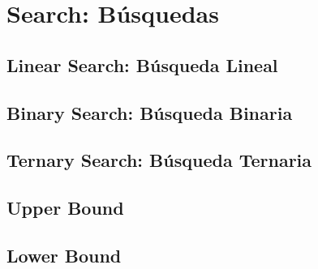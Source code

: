 \documentclass[12pt, fleqn]{report}                             %
\theoremstyle{break}                                            %
\begin{document}
    \clearpage
    \chapter{Search: Búsquedas}

        \section{Linear Search: Búsqueda Lineal}

        \section{Binary Search: Búsqueda Binaria}

        \section{Ternary Search: Búsqueda Ternaria}

        \section{Upper Bound}

        \section{Lower Bound}
\end{document}
